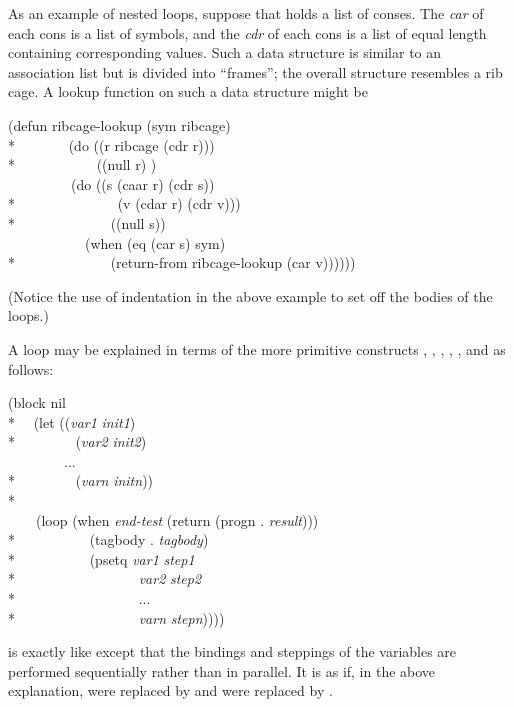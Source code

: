 \begin{defmac}
As an example of nested loops, suppose that  holds a list
of conses.  The \emph{car} of each cons is a list of symbols,
and the \emph{cdr} of each cons is a list of equal length containing
corresponding values.  Such a data structure is similar to an association
list
but is divided into ``frames''; the overall structure resembles a rib cage.
A lookup function on such a data structure might be
\begin{lisp}
(defun ribcage-lookup (sym ribcage) \\*
~~~~~~~(do ((r ribcage (cdr r))) \\*
~~~~~~~~~~~((null r) {\false}) \\
~~~~~~~~~(do ((s (caar r) (cdr s)) \\*
~~~~~~~~~~~~~~(v (cdar r) (cdr v))) \\*
~~~~~~~~~~~~~((null s)) \\
~~~~~~~~~~~(when (eq (car s) sym) \\*
~~~~~~~~~~~~~(return-from ribcage-lookup (car v))))))
\end{lisp}
(Notice the use of indentation in the above example
to set off the bodies of the  loops.)

A  loop may be explained in terms of the more primitive constructs
, , , , ,
and  as follows:
\begin{lisp}
(block nil \\*
~~(let ((\emph{var1} \emph{init1}) \\*
~~~~~~~~(\emph{var2} \emph{init2}) \\
~~~~~~~~... \\*
~~~~~~~~(\emph{varn} \emph{initn})) \\*
~~~~ \\
~~~~(loop (when \emph{end-test} (return (progn . \emph{result}))) \\*
~~~~~~~~~~(tagbody . \emph{tagbody}) \\*
~~~~~~~~~~(psetq \emph{var1} \emph{step1} \\*
~~~~~~~~~~~~~~~~~\emph{var2} \emph{step2} \\*
~~~~~~~~~~~~~~~~~... \\*
~~~~~~~~~~~~~~~~~\emph{varn} \emph{stepn}))))
\end{lisp}
 is exactly like  except that the bindings and steppings
of the variables are performed sequentially rather than in parallel.
It is as if, in the above explanation,
 were replaced by  and  were replaced
by .
\end{defmac}

